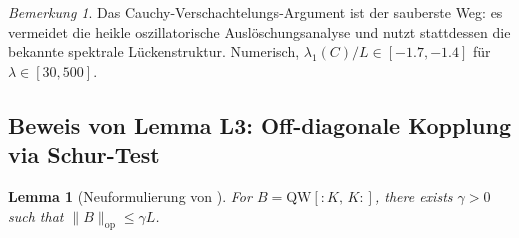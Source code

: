 ﻿\documentclass[12pt,a4paper]{article}
\newtheorem{lemma}[theorem]{Lemma}
\theoremstyle{definition}
\theoremstyle{remark}
\newtheorem{remark}[theorem]{Bemerkung}
\begin{document}
\begin{remark}
Das Cauchy-Verschachtelungs-Argument ist der sauberste Weg: es vermeidet die heikle oszillatorische Auslöschungsanalyse und nutzt stattdessen die bekannte spektrale Lückenstruktur. Numerisch, $\lambda_1(C)/L \in [-1.7, -1.4]$ für $\lambda \in [30, 500]$.
\end{remark}

\subsection{Beweis von Lemma L3: Off-diagonale Kopplung via Schur-Test}
\label{sec:L3-proof}

\begin{lemma}[Neuformulierung von ]
For $B = \mathrm{QW}[{:}K,\,K{:}]$, there exists $\gamma > 0$ such that $\|B\|_{\mathrm{op}} \leq \gamma L$.
\end{lemma}
\end{document}
